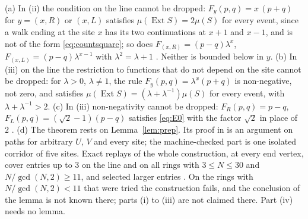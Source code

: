\begin{remark}\label{rem:posprodlimits}
(a) In (ii) the condition on the line cannot be dropped: $F_y(p,q)=x\,(p+q)$ for $y=(x,R)$ or $(x,L)$ satisfies $\mu(\operatorname{Ext}S)=2\mu(S)$ for every event, since a walk ending at the site $x$ has its two continuations at $x+1$ and $x-1$, and is not of the form \eqref{eq:countsquare}; so does $F_{(x,R)}=(p-q)\lambda^x$, $F_{(x,L)}=(p-q)\lambda^{x-1}$ with $\lambda^2=\lambda+1$ \cite{zprod}. Neither is bounded below in $y$.
(b) In (iii) on the line the restriction to functions that do not depend on the site cannot be dropped: for $\lambda>0$, $\lambda\ne1$, the rule $F_y(p,q)=\lambda^x(p+q)$ is non-negative, not zero, and satisfies $\mu(\operatorname{Ext}S)=(\lambda+\lambda^{-1})\mu(S)$ for every event, with $\lambda+\lambda^{-1}>2$.
(c) In (iii) non-negativity cannot be dropped: $F_R(p,q)=p-q$, $F_L(p,q)=(\sqrt2-1)(p-q)$ satisfies \eqref{eq:E0} with the factor $\sqrt2$ in place of $2$ \cite{zprod}.
(d) The theorem rests on Lemma~\ref{lem:prep}. Its proof in \cite{dgmask} is an argument on paths for arbitrary $U$, $V$ and every site; the machine-checked part is one isolated corridor of five sites. Exact replays of the whole construction, at every end vertex, cover entries up to $3$ on the line and on all rings with $3\le N\le30$ and $N/\gcd(N,2)\ge11$, and selected larger entries \cite{dgmask,xr39}. On the rings with $N/\gcd(N,2)<11$ that were tried the construction fails, and the conclusion of the lemma is not known there; parts (i) to (iii) are not claimed there. Part (iv) needs no lemma.
\end{remark}
